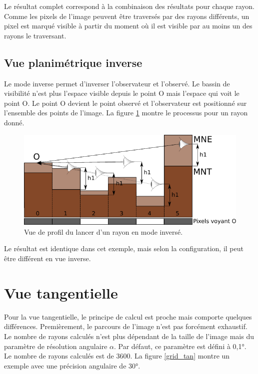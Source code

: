 \documentclass{report}
\begin{document}
Le résultat complet correspond à la combinaison des résultats pour chaque rayon.
Comme les pixels de l'image peuvent être traversés par des rayons différents, un pixel est marqué visible à partir du moment où il est visible par au moins un des rayons le traversant.

\subsection{Vue planimétrique inverse}

Le mode inverse permet d'inverser l'observateur et l'observé. Le bassin de visibilité n'est plus l'espace visible depuis le point O mais l'espace qui voit le point O. Le point O devient le point observé et l'observateur est positionné sur l'ensemble des points de l'image. La figure \ref{ray_side_inverse} montre le processus pour un rayon donné. 

\begin{figure}[H]
	\includegraphics{img/ray_side_inverse-fr.pdf} 
	\caption{Vue de profil du lancer d'un rayon en mode inversé.}
	\label{ray_side_inverse}
\end{figure}

Le résultat est identique dans cet exemple, mais selon la configuration, il peut être différent en vue inverse.

\section{Vue tangentielle}
\label{principles_tan}
Pour la vue tangentielle, le principe de calcul est proche mais comporte quelques différences. Premièrement, le parcours de l'image n'est pas forcément exhaustif. Le nombre de rayons calculés n'est plus dépendant de la taille de l'image mais du paramètre de résolution angulaire $\alpha$. Par défaut, ce paramètre est défini à 0,1°. Le nombre de rayons calculés est de 3600. La figure \ref{grid_tan} montre un exemple avec une précision angulaire de 30°.
\end{document}

